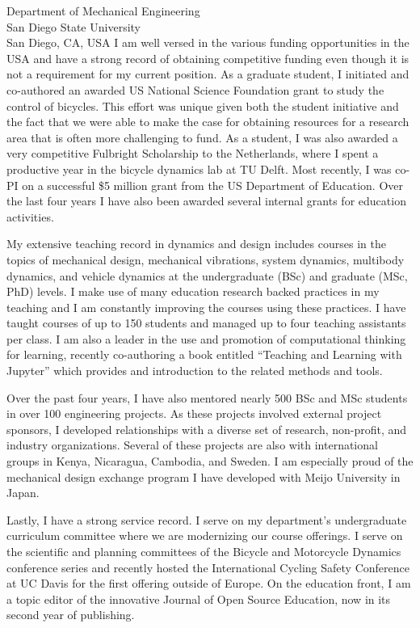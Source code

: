 \documentclass{letter}
\begin{document}
\begin{letter}{
  Department of Mechanical Engineering \\
  San Diego State University \\
  San Diego, CA, USA
}
I am well versed in the various funding opportunities in the USA and have a
strong record of obtaining competitive funding even though it is not a
requirement for my current position. As a graduate student, I initiated and
co-authored an awarded US National Science Foundation grant to study the
control of bicycles. This effort was unique given both the student initiative
and the fact that we were able to make the case for obtaining resources for a
research area that is often more challenging to fund. As a student, I was also
awarded a very competitive Fulbright Scholarship to the Netherlands, where I
spent a productive year in the bicycle dynamics lab at TU Delft. Most recently,
I was co-PI on a successful \$5 million grant from the US Department of
Education. Over the last four years I have also been awarded several internal
grants for education activities.

My extensive teaching record in dynamics and design includes courses in the
topics of mechanical design, mechanical vibrations, system dynamics, multibody
dynamics, and vehicle dynamics at the undergraduate (BSc) and graduate (MSc,
PhD) levels. I make use of many education research backed practices in my
teaching and I am constantly improving the courses using these practices. I
have taught courses of up to 150 students and managed up to four teaching
assistants per class. I am also a leader in the use and promotion of
computational thinking for learning, recently co-authoring a book entitled
``Teaching and Learning with Jupyter'' which provides and introduction to the
related methods and tools.

Over the past four years, I have also mentored nearly 500 BSc and MSc students
in over 100 engineering projects. As these projects involved external project
sponsors, I developed relationships with a diverse set of research, non-profit,
and industry organizations. Several of these projects are also with
international groups in Kenya, Nicaragua, Cambodia, and Sweden. I am especially
proud of the mechanical design exchange program I have developed with Meijo
University in Japan.

Lastly, I have a strong service record. I serve on my department's
undergraduate curriculum committee where we are modernizing our course
offerings. I serve on the scientific and planning committees of the Bicycle and
Motorcycle Dynamics conference series and recently hosted the International
Cycling Safety Conference at UC Davis for the first offering outside of Europe.
On the education front, I am a topic editor of the innovative Journal of Open
Source Education, now in its second year of publishing.


\end{letter}
\end{document}
